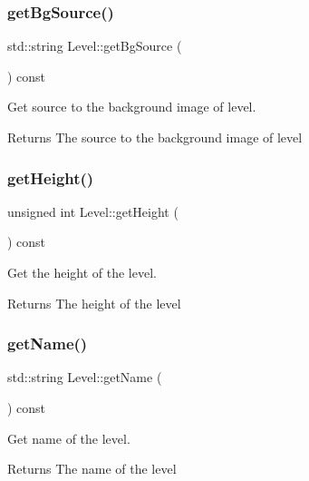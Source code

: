 \subsubsection{\texorpdfstring{get\+Bg\+Source()}{getBgSource()}}
{\footnotesize\ttfamily std\+::string Level\+::get\+Bg\+Source (\begin{DoxyParamCaption}{ }\end{DoxyParamCaption}) const}



Get source to the background image of level. 

\begin{DoxyReturn}{Returns}
The source to the background image of level 
\end{DoxyReturn}
\mbox{\label{classLevel_a134002eee88eb3af6955241948309934}} 
\subsubsection{\texorpdfstring{get\+Height()}{getHeight()}}
{\footnotesize\ttfamily unsigned int Level\+::get\+Height (\begin{DoxyParamCaption}{ }\end{DoxyParamCaption}) const}



Get the height of the level. 

\begin{DoxyReturn}{Returns}
The height of the level 
\end{DoxyReturn}
\mbox{\label{classLevel_a0b6dd5b18919a849c374b67625a849fb}} 
\subsubsection{\texorpdfstring{get\+Name()}{getName()}}
{\footnotesize\ttfamily std\+::string Level\+::get\+Name (\begin{DoxyParamCaption}{ }\end{DoxyParamCaption}) const}



Get name of the level. 

\begin{DoxyReturn}{Returns}
The name of the level 
\end{DoxyReturn}
\mbox{\label{classLevel_ab37b554aa2379fb9c99fa4c83eef1823}} 
